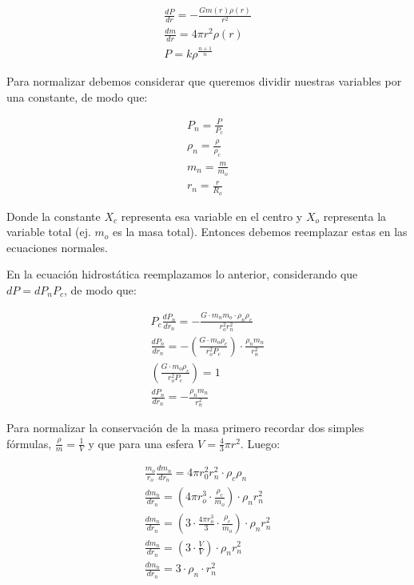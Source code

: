 \documentclass[2pt]{article}
\begin{document}
\begin{subequations}
\begin{align}
		\frac{dP}{dr}=-\frac{Gm(r)\rho (r)}{r^2} \\
		\frac{dm}{dr}= 4\pi r^2 \rho (r) \\
		P=k\rho^{\frac{n+1}{n}}
\end{align}
\end{subequations}

Para normalizar debemos considerar que queremos dividir nuestras variables por una constante, de modo que:
   
\begin{subequations}
\begin{align}
	        P_n=\frac{P}{P_c} \\
		\rho_n=\frac{\rho}{\rho_c} \\
		m_n=\frac{m}{m_o} \\
		r_n=\frac{r}{R_o}	
\end{align}
\end{subequations}

Donde la constante $X_c$ representa esa variable en el centro y $X_o$ representa la variable total (ej. $m_o$ es la masa total). Entonces debemos reemplazar estas en las ecuaciones normales.

En la ecuación hidrostática reemplazamos lo anterior, considerando que $dP=dP_n P_c$, de modo que:

\begin{subequations}
\begin{align}
P_c\frac{dP_n}{dr_n}=- \frac{G\cdot m_n m_o \cdot \rho_n \rho_c }{r_o^2 r_n^2} \\
\frac{dP_n}{dr_n}=-(\frac{G\cdot m_o \rho_c}{r_o^2 P_c}) \cdot \frac{\rho_n m_n}{r_n^2} \\
(\frac{G\cdot m_o \rho_c}{r_o^2 P_c})=1 \\
\frac{dP_n}{dr_n}=-\frac{\rho_n m_n}{r_n^2}
\end{align}
\end{subequations}





Para normalizar la conservación de la masa primero recordar dos simples fórmulas, $\frac{\rho}{m}=\frac{1}{V}$ y que para una esfera $V=\frac{4}{3}\pi r^2$. Luego:

\begin{subequations}
\begin{align}
\frac{m_o}{r_o}\frac{dm_n}{dr_n} = 4 \pi r^2_0 r^2_n \cdot \rho_c \rho_n \\
\frac{dm_n}{dr_n}=(4\pi r^3_o \cdot \frac{\rho_c}{m_o})\cdot \rho_n r^2_n \\
\frac{dm_n}{dr_n}=(3\cdot \frac{4\pi r^3_o}{3} \cdot \frac{\rho_c}{m_o})\cdot \rho_n r^2_n \\
\frac{dm_n}{dr_n}=(3\cdot \frac{V}{V})\cdot \rho_n r^2_n \\
\frac{dm_n}{dr_n}=3\cdot \rho_n \cdot r^2_n
\end{align}
\end{subequations}
\end{document}
